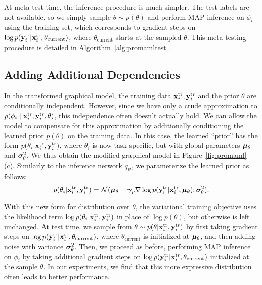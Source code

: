 \documentclass{article}
\begin{document}
At meta-test time, the inference procedure is much simpler. The test labels are not available, so we simply sample $\theta \sim p(\theta)$ and perform MAP inference on $\phi_i$ using the training set, which corresponds to gradient steps on $\log p(\mathbf{y}^{\text{tr}}_i | \mathbf{x}^{\text{tr}}_i, \theta_\text{current})$, where $\theta_\text{current}$ starts at the sampled $\theta$. This meta-testing procedure is detailed in Algorithm~\ref{alg:promamltest}.




\vspace{-0.3cm}
\subsection{Adding Additional Dependencies}
\vspace{-0.2cm}

In the transformed graphical model, the training data $\mathbf{x}^{\text{tr}}_i, \mathbf{y}^{\text{tr}}_i$ and the prior $\theta$ are conditionally independent. However, since we have only a crude approximation to $p(\phi_i \mid \mathbf{x}^{\text{tr}}_i, \mathbf{y}^{\text{tr}}_i, \theta)$, this independence often doesn't actually hold. We can allow the model to compensate for this approximation by additionally conditioning the learned prior $p(\theta)$ on the training data. In this case, the learned ``prior'' has the form $p(\theta_i | \mathbf{x}^{\text{tr}}_i, \mathbf{y}^{\text{tr}}_i)$, where $\theta_i$ is now task-specific, but with global parameters $\bm{\mu}_\theta$ and $\bm{\sigma}_\theta^2$. We thus obtain the modified graphical model in Figure~\ref{fig:promaml} (c). Similarly to the inference network $q_\psi$, we parameterize the learned prior as follows:
\[
p(\theta_i | \mathbf{x}^{\text{tr}}_i, \mathbf{y}^{\text{tr}}_i) = 
\mathcal{N}(\bm{\mu}_\theta + \bm{\gamma}_p \nabla \log p(\mathbf{y}^{\text{tr}}_i | \mathbf{x}^{\text{tr}}_i, \bm{\mu}_\theta) ; \bm{\sigma}_\theta^2).
\]

With this new form for distribution over $\theta$, the variational training objective uses the likelihood term $\log p(\theta_i | \mathbf{x}^{\text{tr}}_i, \mathbf{y}^{\text{tr}}_i)$ in place of $\log p(\theta)$, but otherwise is left unchanged. At test time, we sample from $\theta \sim p(\theta | \mathbf{x}^{\text{tr}}_i, \mathbf{y}^{\text{tr}}_i)$ by first taking gradient steps on $\log p(\mathbf{y}^{\text{tr}}_i|\mathbf{x}^{\text{tr}}_i, \theta_\text{current})$, where $\theta_\text{current}$ is initialized at $\bm{\mu}_\theta$, and then adding noise with variance $\bm{\sigma}_\theta^2$. Then, we proceed as before, performing MAP inference on $\phi_i$ by taking additional gradient steps on $\log p(\mathbf{y}^{\text{tr}}_i|\mathbf{x}^{\text{tr}}_i, \theta_\text{current})$ initialized at the sample $\theta$.
In our experiments, we find that this more expressive distribution often leads to better performance.
\end{document}
